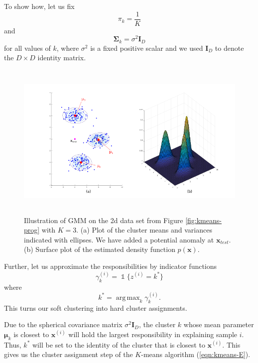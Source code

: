 \documentclass[final,3p,times,twocolumn]{elsarticle}
\DeclareMathOperator*{\argmax}{arg\,max}
\let\bs\boldsymbol
\DeclareMathOperator*{\id}{\mathds{1}}
\begin{document}
To show how, let us fix 
\begin{equation*}
\pi_k = \frac{1}{K}
\end{equation*}
and 
\begin{equation*}
\bs\Sigma_k = \sigma^2 \bs I_D
\end{equation*}
for all values of $k$, where $\sigma^2$ is a fixed positive scalar and we used $\bs I_D$ to denote the $D\times D$ identity matrix. 

\begin{figure}
\centering
\includegraphics[width=\textwidth,height=3in]{gmmdemo.png}
\caption{Illustration of GMM on the 2d data set from Figure \ref{fig:kmeans-prog} with $K=3$. 
(a) Plot of the cluster means and variances indicated with ellipses. We have added a potential anomaly at $\bs x_{test}$. 
(b) Surface plot of the estimated density function $p(\bs x)$.}
\label{fig:gmm-demo}
\end{figure}

Further, let us approximate the responsibilities by indicator functions
\begin{equation*}
\gamma_k^{(i)} = \id\{z^{(i)} = k^*\}
\end{equation*}
where
\begin{equation*}
k^* = \argmax_k \gamma_k^{(i)}.
\end{equation*}
This turns our soft clustering into hard cluster assignments.

Due to the spherical covariance matrix $\sigma^2 \bs I_D$, the cluster $k$ whose mean parameter $\bs\mu_k$ is closest to $\bs x^{(i)}$ will hold the largest responsibility in explaining sample $i$.
Thus, $k^*$ will be set to the identity of the cluster that is closest to $\boldsymbol x^{(i)}$.
This gives us the cluster assignment step of the $K$-means algorithm (\ref{eqn:kmeans-E}).
\end{document}
